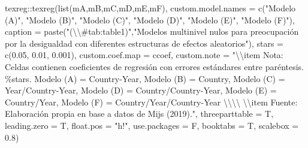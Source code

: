 \documentclass[
  12pt,
  a4paper,
]{article}
\newenvironment{Shaded}{\begin{snugshade}}{\end{snugshade}}
\newcommand{\AttributeTok}[1]{\textcolor[rgb]{0.77,0.63,0.00}{#1}}
\newcommand{\FloatTok}[1]{\textcolor[rgb]{0.00,0.00,0.81}{#1}}
\newcommand{\FunctionTok}[1]{\textcolor[rgb]{0.00,0.00,0.00}{#1}}
\newcommand{\NormalTok}[1]{#1}
\newcommand{\SpecialCharTok}[1]{\textcolor[rgb]{0.00,0.00,0.00}{#1}}
\newcommand{\StringTok}[1]{\textcolor[rgb]{0.31,0.60,0.02}{#1}}
\begin{document}
\begin{Shaded}
\begin{Highlighting}[]
\NormalTok{texreg}\SpecialCharTok{::}\FunctionTok{texreg}\NormalTok{(}\FunctionTok{list}\NormalTok{(mA,mB,mC,mD,mE,mF),}
               \AttributeTok{custom.model.names =} \FunctionTok{c}\NormalTok{(}\StringTok{"Modelo (A)"}\NormalTok{,}
                                      \StringTok{"Modelo (B)"}\NormalTok{,}
                                      \StringTok{"Modelo (C)"}\NormalTok{,}
                                      \StringTok{"Modelo (D)"}\NormalTok{,}
                                      \StringTok{"Modelo (E)"}\NormalTok{,}
                                      \StringTok{"Modelo (F)"}\NormalTok{),}
               \AttributeTok{caption =} \FunctionTok{paste}\NormalTok{(}\StringTok{"(}\SpecialCharTok{\textbackslash{}\textbackslash{}}\StringTok{\#tab:table1)"}\NormalTok{,}\StringTok{"Modelos multinivel nulos para preocupación por la desigualdad con diferentes estructuras de efectos aleatorios"}\NormalTok{),}
               \AttributeTok{stars =} \FunctionTok{c}\NormalTok{(}\FloatTok{0.05}\NormalTok{, }\FloatTok{0.01}\NormalTok{, }\FloatTok{0.001}\NormalTok{),}
               \AttributeTok{custom.coef.map =}\NormalTok{ ccoef,}
               \AttributeTok{custom.note =} \StringTok{"}\SpecialCharTok{\textbackslash{}\textbackslash{}}\StringTok{item Nota: Celdas contienen coeficientes de regresión con errores estándares entre paréntesis. \%stars. Modelo (A) = Country{-}Year, Modelo (B) = Country, Modelo (C) = Year/Country{-}Year, Modelo (D) = Country/Country{-}Year, Modelo (E) = Country/Year, Modelo (F) = Country/Year/Country{-}Year }\SpecialCharTok{\textbackslash{}\textbackslash{}\textbackslash{}\textbackslash{}}\StringTok{ }\SpecialCharTok{\textbackslash{}\textbackslash{}}\StringTok{item Fuente: Elaboración propia en base a datos de Mijs (2019)."}\NormalTok{,}
               \AttributeTok{threeparttable =}\NormalTok{ T,}
               \AttributeTok{leading.zero =}\NormalTok{ T,}
               \AttributeTok{float.pos =} \StringTok{"h!"}\NormalTok{,}
               \AttributeTok{use.packages =}\NormalTok{ F,}
               \AttributeTok{booktabs =}\NormalTok{ T,}
               \AttributeTok{scalebox =} \FloatTok{0.8}\NormalTok{)}


\end{Highlighting}
\end{Shaded}
\end{document}
